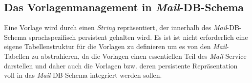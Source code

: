 \subsection{Das Vorlagenmanagement in \emph{Mail}-DB-Schema}
Eine Vorlage wird durch einen \emph{String} repräsentiert, der innerhalb des \emph{Mail}-DB-Schema sprachspezifisch  persistent gehalten wird. Es ist ist nicht erforderlich eine eigene Tabellenstruktur für die Vorlagen zu definieren um es von den \emph{Mail}-Tabellen zu abstrahieren, da die Vorlagen einen essentiellen Teil des \emph{Mail}-Service darstellen und daher auch die Vorlagen bzw. deren persistente Repräsentation voll in das \emph{Mail}-DB-Schema  integriert werden sollen.